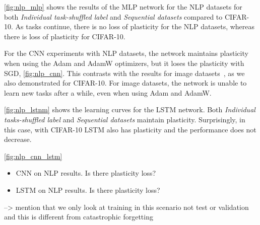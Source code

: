 \autoref{fig:nlp_mlp} shows the results of the MLP network for the NLP datasets for both \textit{Individual task-shuffled label} and \textit{Sequential datasets} compared to CIFAR-10. As tasks continue, there is no loss of plasticity for the NLP datasets, whereas there is loss of plasticity for CIFAR-10.


For the CNN experiments with NLP datasets, the network maintains plasticity when using the Adam and AdamW optimizers, but it loses the plasticity with SGD, \autoref{fig:nlp_cnn}. This contrasts with the results for image datasets~\cite{plasticity papers}, as we also demonstrated for CIFAR-10. For image datasets, the network is unable to learn new tasks after a while, even when using Adam and AdamW.

\autoref{fig:nlp_lstnm} shows the learning curves for the LSTM network. Both \textit{Individual tasks-shuffled label} and \textit{Sequential datasets} maintain plasticity. Surprisingly, in this case, with CIFAR-10 LSTM also has plasticity and the performance does not decrease. 




\autoref{fig:nlp_cnn_lstm}
\begin{itemize}
    \item CNN on NLP results. Is there plasticity loss? 
    \item LSTM on NLP results. Is there plasticity loss? 
\end{itemize}



--> mention that we only look at training in this scenario not test or validation and this is different from catastrophic forgetting 

